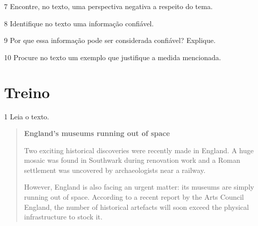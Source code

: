 \num{7} Encontre, no texto, uma perspectiva negativa a respeito do tema.



\num{8} Identifique no texto uma informação confiável.



\num{9} Por que essa informação pode ser considerada confiável? Explique.



\num{10} Procure no texto um exemplo que justifique a medida mencionada.



\section{Treino}

\num{1} Leia o texto.

\begin{quote}
\textbf{England's museums running out of space}

Two exciting historical discoveries were recently made in England. A huge mosaic was found in Southwark during renovation work and a Roman settlement was uncovered by archaeologists near a railway.

However, England is also facing an urgent matter: its museums are simply running out of space. According to a recent report by the Arts
Council England, the number of historical artefacts will soon exceed the physical infrastructure to stock it. 

\end{quote}

